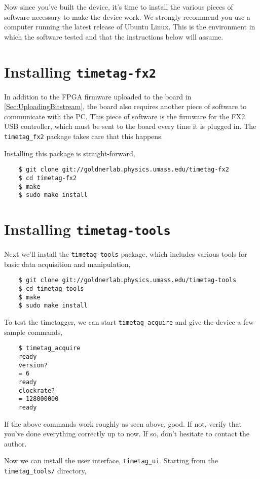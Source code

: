 Now since you've built the device, it's time to install the various
pieces of software necessary to make the device work. We strongly
recommend you use a computer running the latest release of Ubuntu
Linux. This is the environment in which the software tested and that
the instructions below will assume.

\section{Installing {\tt timetag-fx2}}
In addition to the FPGA firmware uploaded to the board in
\ref{Sec:UploadingBitstream}, the board also requires another piece of
software to communicate with the PC. This piece of software is the
firmware for the FX2 USB controller, which must be sent to the board
every time it is plugged in. The {\tt timetag\_fx2} package takes care
that this happens.

Installing this package is straight-forward,

\begin{verbatim}
    $ git clone git://goldnerlab.physics.umass.edu/timetag-fx2
    $ cd timetag-fx2
    $ make
    $ sudo make install
\end{verbatim}

\section{Installing {\tt timetag-tools}}

Next we'll install the {\tt timetag-tools} package, which includes
various tools for basic data acquisition and manipulation,

\begin{verbatim}
    $ git clone git://goldnerlab.physics.umass.edu/timetag-tools
    $ cd timetag-tools
    $ make
    $ sudo make install
\end{verbatim}

To test the timetagger, we can start {\tt timetag\_acquire} and give
the device a few sample commands,

\begin{verbatim}
    $ timetag_acquire
    ready
    version?
    = 6
    ready
    clockrate?
    = 128000000
    ready
\end{verbatim}

If the above commands work roughly as seen above, good. If not, verify
that you've done everything correctly up to now. If so, don't hesitate
to contact the author.

Now we can install the user interface, {\tt timetag\_ui}. Starting from the
{\tt timetag\_tools/} directory,

